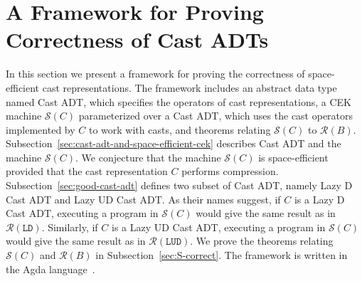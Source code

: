 \documentclass[runningheads]{llncs}
\newcommand{\RMachine}[1]{\ensuremath{\mathcal{R}(#1)}}
\newcommand{\LDMachine}{\RMachine{\BLD}}
\newcommand{\LUDMachine}{\RMachine{\BLUD}}
\newcommand{\SMachine}[1]{\ensuremath{\mathcal{S}(#1)}}
\newcommand{\BLD}[0]{\ensuremath{\mathtt{LD}}}
\newcommand{\BLUD}[0]{\ensuremath{\mathtt{LUD}}}
\begin{document}
\section{A Framework for Proving Correctness of Cast ADTs}
\label{sec:framework}

In this section we present a framework for proving the correctness of
space-efficient cast representations. The framework includes an
abstract data type named Cast ADT, which specifies the operators of
cast representations, a CEK machine $\SMachine{C}$ parameterized over
a Cast ADT, which uses the cast operators implemented by $C$ to work
with casts, and theorems relating $\SMachine{C}$ to $\RMachine{B}$.
%
Subsection~\ref{sec:cast-adt-and-space-efficient-cek} describes Cast ADT and the 
machine \SMachine{C}. We conjecture that the machine \SMachine{C} is 
space-efficient provided that the cast representation $C$ performs compression.
%
Subsection~\ref{sec:good-cast-adt} defines two subset of Cast ADT, namely Lazy D 
Cast ADT and Lazy UD Cast ADT. As their names suggest, if $C$ is a Lazy D Cast 
ADT, executing a program in $\SMachine{C}$ would give the same result as in 
$\LDMachine$. Similarly, if $C$ is a Lazy UD Cast ADT, executing a program in 
$\SMachine{C}$ would give the same result as in $\LUDMachine$.
%
We prove the theorems relating \SMachine{C} and \RMachine{B} in
Subsection~\ref{sec:S-correct}.
The framework is written in the Agda language~\citep{norell2008dependently}.
\end{document}
